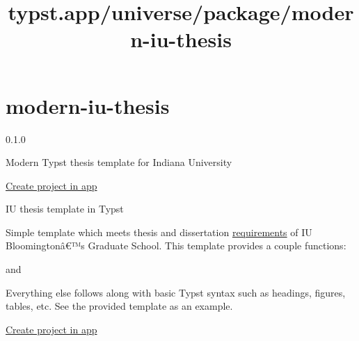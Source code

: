 \title{typst.app/universe/package/modern-iu-thesis}

\label{banner}
\label{template-thumbnail}

\section{modern-iu-thesis}\label{modern-iu-thesis}

{ 0.1.0 }

Modern Typst thesis template for Indiana University

\href{/app?template=modern-iu-thesis&version=0.1.0}{Create project in
app}

\label{readme}
IU thesis template in Typst

Simple template which meets thesis and dissertation
\href{https://graduate.indiana.edu/academic-requirements/thesis-dissertation/index.html}{requirements}
of IU Bloomingtonâ€™s Graduate School. This template provides a couple
functions:

\begin{Shaded}
\begin{Highlighting}[]
\NormalTok{        (}
\NormalTok{        ),}
\NormalTok{    ),}
\NormalTok{)}
\end{Highlighting}
\end{Shaded}

and

\begin{Shaded}
\begin{Highlighting}[]
\end{Highlighting}
\end{Shaded}

Everything else follows along with basic Typst syntax such as headings,
figures, tables, etc. See the provided template as an example.

\href{/app?template=modern-iu-thesis&version=0.1.0}{Create project in
app}


